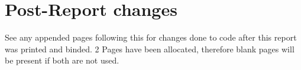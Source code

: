 \chapter{Post-Report changes}

See any appended pages following this for changes done to code after this report was printed and binded. 2 Pages have been allocated, therefore blank pages will be present if both are not used.

\clearpage

\newpage\mbox{}\newpage
\newpage\mbox{}\newpage